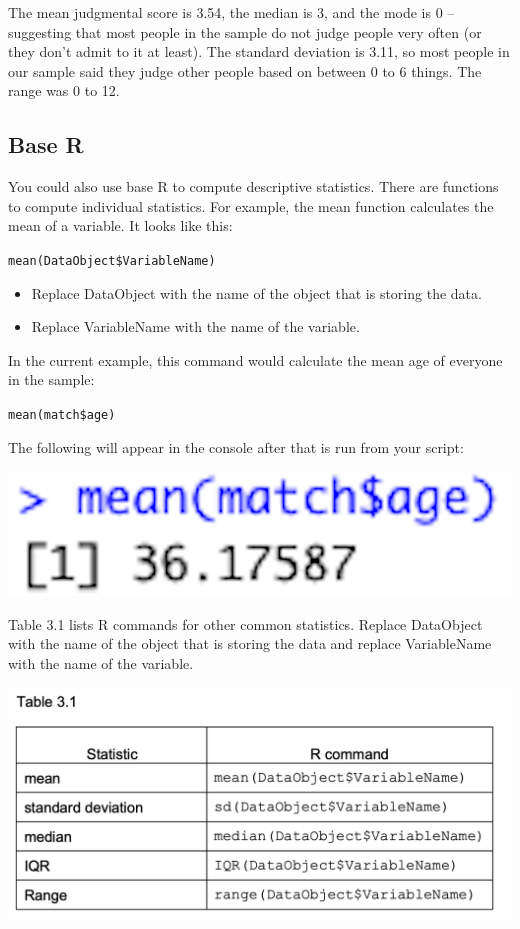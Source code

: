 \documentclass[
]{book}
\providecommand{\tightlist}{%
  \setlength{\itemsep}{0pt}\setlength{\parskip}{0pt}}
\begin{document}
The mean judgmental score is 3.54, the median is 3, and the mode is 0 -- suggesting that most people in the sample do not judge people very often (or they don't admit to it at least). The standard deviation is 3.11, so most people in our sample said they judge other people based on between 0 to 6 things. The range was 0 to 12.

\hypertarget{base-r}{%
\subsection{Base R}\label{base-r}}

You could also use base R to compute descriptive statistics. There are functions to compute individual statistics. For example, the mean function calculates the mean of a variable. It looks like this:

\texttt{mean(DataObject\$VariableName)}

\begin{itemize}
\tightlist
\item
  Replace DataObject with the name of the object that is storing the data.\\
\item
  Replace VariableName with the name of the variable.
\end{itemize}

In the current example, this command would calculate the mean age of everyone in the sample:

\texttt{mean(match\$age)}

The following will appear in the console after that is run from your script:

\includegraphics{img/3R.5.png}

Table 3.1 lists R commands for other common statistics. Replace DataObject with the name of the object that is storing the data and replace VariableName with the name of the variable.

\includegraphics{img/table3.1.png}
\end{document}
